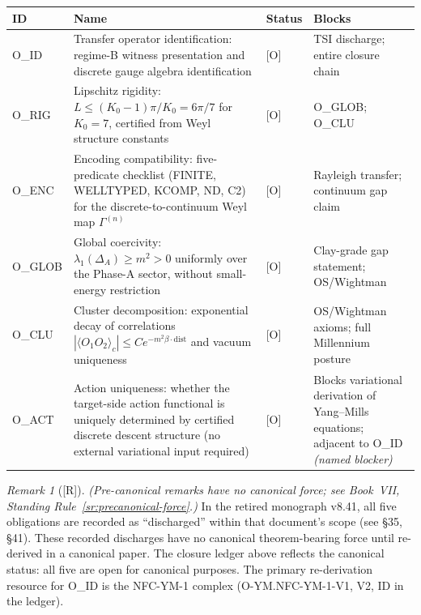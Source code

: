 \documentclass[12pt,oneside]{amsbook}
\theoremstyle{plain}
\theoremstyle{definition}
\theoremstyle{remark}
\newtheorem{remark}[theorem]{Remark}
\newcommand{\status}[1]{\textup{[#1]}}
\begin{document}
\medskip
\renewcommand{\arraystretch}{1.4}
\noindent
\begin{tabular}{@{}p{1.8cm}p{4.0cm}p{1.5cm}p{4.5cm}@{}}
\hline
\textbf{ID} & \textbf{Name} & \textbf{Status} & \textbf{Blocks} \\
\hline
O\_ID & Transfer operator identification: regime-B witness presentation and discrete gauge algebra identification & [O] &
 TSI discharge; entire closure chain \\
O\_RIG & Lipschitz rigidity: $L \leq (K_0-1)\pi/K_0 = 6\pi/7$ for $K_0=7$, certified from Weyl structure constants & [O] &
 O\_GLOB; O\_CLU \\
O\_ENC & Encoding compatibility: five-predicate checklist (FINITE, WELLTYPED, KCOMP, ND, C2) for the discrete-to-continuum Weyl map $\Gamma^{(n)}$ & [O] &
 Rayleigh transfer; continuum gap claim \\
O\_GLOB & Global coercivity: $\lambda_1(\Delta_A) \geq m^2 > 0$ uniformly over the Phase-A sector, without small-energy restriction & [O] &
 Clay-grade gap statement; OS/Wightman \\
O\_CLU & Cluster decomposition: exponential decay of correlations $|\langle O_1 O_2\rangle_c| \leq Ce^{-m^2\beta\cdot\mathrm{dist}}$ and vacuum uniqueness & [O] &
 OS/Wightman axioms; full Millennium posture \\
O\_ACT & Action uniqueness: whether the target-side action functional is uniquely determined by certified discrete descent structure (no external variational input required) & [O] &
 Blocks variational derivation of Yang--Mills equations; adjacent to O\_ID \textit{(named blocker)} \\
\hline
\end{tabular}
\renewcommand{\arraystretch}{1}

\medskip

\begin{remark}[\status{R}]\textit{(Pre-canonical remarks have no canonical force;
see Book~VII, Standing Rule~\ref{sr:precanonical-force}.)} 
In the retired monograph v8.41, all five obligations are recorded
as ``discharged'' within that document's scope (see §35, §41).
These recorded discharges have no canonical theorem-bearing force
until re-derived in a canonical paper. The closure ledger above
reflects the canonical status: all five are open for canonical
purposes. The primary re-derivation resource for O\_ID is the
NFC-YM-1 complex (O-YM.NFC-YM-1-V1, V2, ID in the ledger).
\end{remark}


\end{document}
